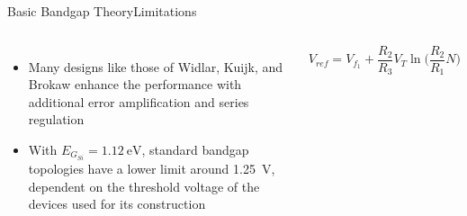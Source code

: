 \documentclass[aspectratio=1610]{beamer} %
\begin{document}
\begin{frame}{Basic Bandgap Theory}{Limitations}

    \begin{columns}[c]
        \begin{itemize}
            \item Many designs like those of Widlar, Kuijk, and Brokaw enhance the performance with additional error amplification and series regulation
            \item With \(E_{G_{Si}} = \qty{1.12}{\eV}\), standard bandgap topologies have a lower limit around \qty{1.25}{\V}, dependent on the threshold voltage of the devices used for its construction
        \end{itemize}
        \vspace*{-4pt}
        \small
        \begin{equation}
            V_{ref} = V_{f_1} + \frac{R_2}{R_3}V_T\ln\Biggl(\frac{R_2}{R_1}N\Biggr)
        \label{eq:conv_vout}
        \end{equation}
    

\end{columns}
\end{frame}
\end{document}
